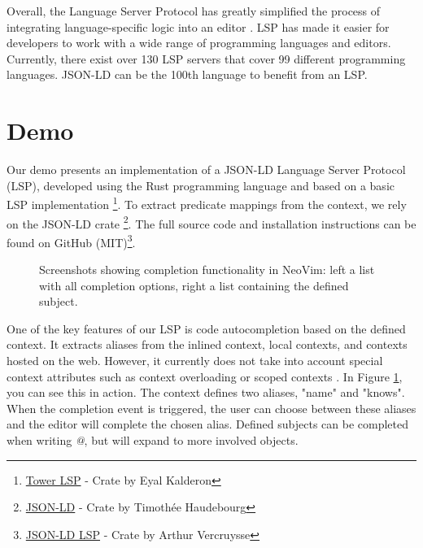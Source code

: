 \documentclass[
]{ceurart}
\begin{document}
Overall, the Language Server Protocol has greatly simplified the process of integrating language-specific logic into an editor \cite{LSP-editor}. LSP has made it easier for developers to work with a wide range of programming languages and editors. Currently, there exist over 130 LSP servers that cover 99 different programming languages. JSON-LD can be the 100th language to benefit from an LSP.

\section{Demo}

Our demo presents an implementation of a JSON-LD Language Server Protocol (LSP), developed using the Rust programming language and based on a basic LSP implementation \footnote{\href{https://crates.io/crates/tower-lsp}{Tower LSP} - Crate by Eyal Kalderon}. To extract predicate mappings from the context, we rely on the JSON-LD crate \footnote{\href{https://crates.io/crates/json-ld}{JSON-LD} - Crate by Timothée Haudebourg}. The full source code and installation instructions can be found on GitHub (MIT)\footnote{\href{https://github.com/ajuvercr/jsonld-lsp}{JSON-LD LSP} - Crate by Arthur Vercruysse}.

\begin{figure}
\centering
{}
\caption{Screenshots showing completion functionality in NeoVim: left a list with all completion options, right a list containing the defined subject.}
\label{fig:complete}
\end{figure}


One of the key features of our LSP is code autocompletion based on the defined context. It extracts aliases from the inlined context, local contexts, and contexts hosted on the web. However, it currently does not take into account special context attributes such as context overloading or scoped contexts \cite{JSON-LD-W3C}. In Figure \ref{fig:complete}, you can see this in action. The context defines two aliases, "name" and "knows". When the completion event is triggered, the user can choose between these aliases and the editor will complete the chosen alias. Defined subjects can be completed when writing \textit{@}, but will expand to more involved objects.
\end{document}
